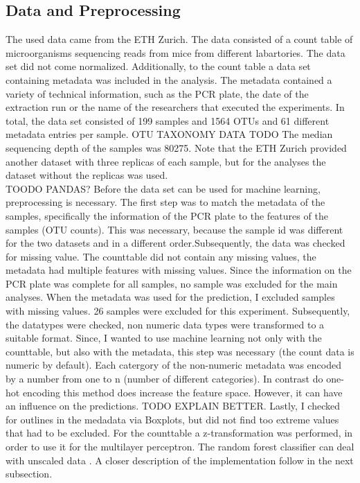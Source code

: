 \documentclass{svproc}
\begin{document}
\subsection{Data and Preprocessing}

The used data came from the ETH Zurich. The data consisted of a count table of microorganisms  sequencing reads from mice from different labartories. The data set did not come normalized. Additionally, to the count table a data set containing metadata was included in the analysis. The metadata contained a variety of technical information, such as the PCR plate, the date of the extraction run or the name of the researchers that executed the experiments. In total, the data set consisted of 199 samples and 1564 OTUs and 61 different metadata entries per sample. OTU TAXONOMY DATA TODO The median sequencing depth of the samples was 80275. Note that the ETH Zurich provided another dataset with three replicas of each sample, but for the analyses the dataset without the replicas was used.\\

TOODO PANDAS?
Before the data set can be used for machine learning, preprocessing is necessary. The first step was to match the metadata of the samples, specifically the information of the PCR plate to the features of the samples (OTU counts). This was necessary, because the sample id was different for the two datasets and in a different order.Subsequently, the data was checked for missing value. The counttable did not contain any missing values, the metadata had multiple features with missing values. Since the information on the PCR plate was complete for all samples, no sample was excluded for the main analyses. When the metadata was used for the prediction, I excluded samples with missing values. 26 samples were excluded for this experiment. Subsequently, the datatypes were checked, non numeric data types were transformed to a suitable format. Since, I wanted to use machine learning not only with the counttable, but also with the metadata, this step was necessary (the count data is numeric by default). Each catergory of the non-numeric metadata was encoded by a number from one to n (number of different categories). In contrast do one-hot encoding this method does increase the feature space. However, it can have an influence on the predictions. TODO EXPLAIN BETTER. 
Lastly, I checked for outlines in the medadata via Boxplots, but did not find too extreme values that had to be excluded. For the counttable a z-transformation was performed, in order to use it for the multilayer perceptron. The random forest classifier can deal with unscaled data \citep{TOO RF paper}. A closer description of the implementation follow in the next subsection.
\end{document}
